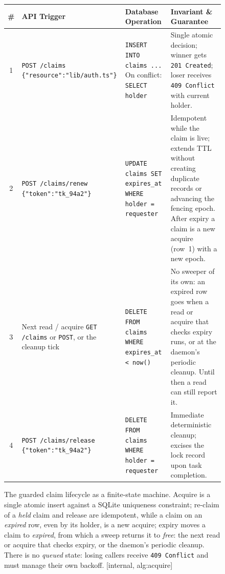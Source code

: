 \begin{figure}[H]
\medskip
\begingroup\footnotesize
\begin{tabularx}{\linewidth}{@{}c >{\raggedright\arraybackslash}p{2.6cm} >{\raggedright\arraybackslash}p{3.1cm} >{\raggedright\arraybackslash}X@{}}
\toprule
\textbf{\#} & \textbf{API Trigger} & \textbf{Database Operation} & \textbf{Invariant \& Guarantee} \\
\midrule
1 & \texttt{POST /claims} \newline \texttt{\{"resource":"lib/auth.ts"\}} & \texttt{INSERT INTO claims ...} \newline On conflict: \texttt{SELECT holder} & Single atomic decision; winner gets \texttt{201 Created}; loser receives \texttt{409 Conflict} with current holder. \\
2 & \texttt{POST /claims/renew} \newline \texttt{\{"token":"tk\_94a2"\}} & \texttt{UPDATE claims SET expires\_at} \newline \texttt{WHERE holder = requester} & Idempotent while the claim is live; extends TTL without creating duplicate records or advancing the fencing epoch. After expiry a claim is a new acquire (row~1) with a new epoch. \\
3 & Next read / acquire \newline \texttt{GET /claims} or \texttt{POST}, \newline or the cleanup tick & \texttt{DELETE FROM claims} \newline \texttt{WHERE expires\_at < now()} & No sweeper of its own: an expired row goes when a read or acquire that checks expiry runs, or at the daemon's periodic cleanup. Until then a read can still report it. \\
4 & \texttt{POST /claims/release} \newline \texttt{\{"token":"tk\_94a2"\}} & \texttt{DELETE FROM claims} \newline \texttt{WHERE holder = requester} & Immediate deterministic cleanup; excises the lock record upon task completion. \\
\bottomrule
\end{tabularx}\endgroup
\caption{The guarded claim lifecycle as a finite-state machine. Acquire is a single atomic insert against a SQLite uniqueness constraint; re-claim of a \emph{held} claim and release are idempotent, while a claim on an \emph{expired} row, even by its holder, is a new acquire; expiry moves a claim to \emph{expired}, from which a sweep returns it to \emph{free}: the next read or acquire that checks expiry, or the daemon's periodic cleanup. There is no \emph{queued} state: losing callers receive \texttt{409 Conflict} and must manage their own backoff. [internal, alg:acquire]}
\label{fig:swk-claim-lifecycle}
\end{figure}
